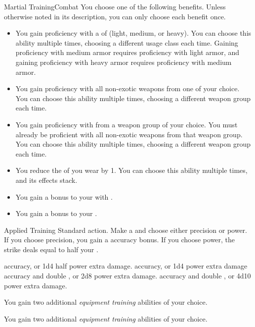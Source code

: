   \begin{feat}{Martial Training}{Combat}
     You choose one of the following benefits.
    Unless otherwise noted in its description, you can only choose each benefit once.
    \begin{itemize}
      \item You gain proficiency with a  of  (light, medium, or heavy).
        You can choose this ability multiple times, choosing a different usage class each time.
        Gaining proficiency with medium armor requires proficiency with light armor, and gaining proficiency with heavy armor requires proficiency with medium armor.
      \item You gain proficiency with all non-exotic weapons from one  of your choice.
        You can choose this ability multiple times, choosing a different weapon group each time.
      \item You gain proficiency with  from a weapon group of your choice.
        You must already be proficient with all non-exotic weapons from that weapon group.
        You can choose this ability multiple times, choosing a different weapon group each time.
      \item You reduce the  of  you wear by 1.
        You can choose this ability multiple times, and its effects stack.
      \item You gain a  bonus to your  with .
      \item You gain a  bonus to your .
    \end{itemize}

    \begin{activeability}{Applied Training}
      \abilityusagetime Standard action.
      \rankline
      Make a  and choose either precision or power.
      If you choose precision, you gain a  accuracy bonus.
      If you choose power, the strike deals  equal to half your .

      \rankline
        accuracy, or 1d4 \add half power extra damage.
        accuracy, or 1d4 \add power extra damage
        accuracy and double , or 2d8 \add power extra damage.
        accuracy and double , or 4d10 \add power extra damage.
    \end{activeability}

     You gain two additional \textit{equipment training} abilities of your choice.

     You gain two additional \textit{equipment training} abilities of your choice.
  \end{feat}

